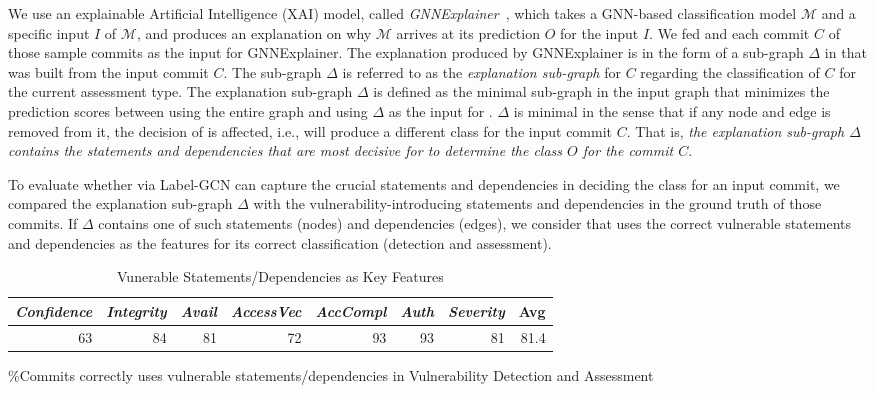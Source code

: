 We use an explainable Artificial Intelligence (XAI) model,
called {\em GNNExplainer}~\cite{GNNExplainer}, which takes a GNN-based
classification model $\mathcal{M}$ and a specific input $I$ of
$\mathcal{M}$, and produces an explanation on why $\mathcal{M}$
arrives at its prediction $O$ for the input $I$.
%
We fed {\tool} and each commit $C$ of those sample commits as the
input for GNNExplainer. The explanation produced by GNNExplainer is in
the form of a sub-graph $\Delta$ in {\mvpdg} that was built from the
input commit $C$. The sub-graph $\Delta$ is referred to as the {\em
explanation sub-graph} for $C$ regarding the classification of $C$ for
the current assessment type. The explanation sub-graph $\Delta$ is
defined as the minimal sub-graph in the input graph {\mvpdg} that
minimizes the prediction scores between using the entire graph
{\mvpdg} and using $\Delta$ as the input for {\tool}. $\Delta$ is
minimal in the sense that if any node and edge is removed from it, the
decision of {\tool} is affected, i.e., {\tool} will produce a
different class for the input commit $C$. That is, {\em the
explanation sub-graph $\Delta$ contains the statements and
dependencies that are most decisive for {\tool} to determine the class
$O$ for the commit $C$}.

To evaluate whether {\tool} via Label-GCN can capture the crucial
statements and dependencies in deciding the class for an input commit,
we compared the explanation sub-graph $\Delta$ with the
vulnerability-introducing statements and dependencies in the ground
truth of those commits. If $\Delta$ contains one of such statements
(nodes) and dependencies (edges), we consider that {\tool} uses the
correct vulnerable statements and dependencies as the features for its
correct classification (detection and assessment).


\begin{table}[t]
\caption{Vunerable Statements/Dependencies as Key Features}
	\vspace{-12pt}
	\tabcolsep 2.3pt
\small
	\begin{center}
\begin{tabular}{|r|r|r|r|r|r|r||r|}
  \hline
     {\em Confidence} & {\em Integrity} & {\em Avail} & {\em AccessVec} & {\em AccCompl} & {\em Auth} & {\em Severity} & {\bf Avg} \\
  \hline
    63 & 84 & 81 & 72 & 93 & 93 & 81 & 81.4 \\
  \hline
\end{tabular}
\label{gnn}
\%Commits {\tool} correctly uses vulnerable statements/dependencies in Vulnerability Detection and Assessment
\end{center}
\vspace{-12pt}
\end{table}

